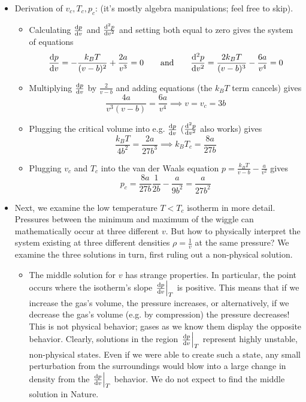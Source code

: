 \documentclass[11pt, a4paper]{article}
\begin{document}
\begin{itemize}
\begin{itemize}
	\end{itemize}
	
	\item Derivation of $ v_{c}, T_{c}, p_{c} $: (it's mostly algebra manipulations; feel free to skip). 
	\begin{itemize}
		\item Calculating $  \dv{p}{v} $ and $ \dv[2]{p}{v} $ and setting both equal to zero gives the system of equations
		\begin{equation*}
			\dv{p}{v} = -\frac{k_{B}T}{(v-b)^{2}} + \frac{2a}{v^{3}} = 0 \qquad \text{and} \qquad  \dv[2]{p}{v} = \frac{2k_{B}T}{(v-b)^{3}} - \frac{6a}{v^{4}} = 0
		\end{equation*}
		\item Multiplying $ \dv{p}{v} $ by $ \frac{2}{v-b} $ and adding  equations (the $ k_{B}T $ term cancels) gives 
		\begin{equation*}
			\frac{4a}{v^{3}(v-b)} = \frac{6a}{v^{4}} \implies v = v_{c} = 3b
		\end{equation*}
		
		\item Plugging the critical volume into e.g. $  \dv{p}{v} $ ($ \dv[2]{p}{v} $ also works) gives
		\begin{equation*}
			\frac{k_{B}T}{4b^{2}} = \frac{2a}{27b^{3}} \implies k_{B}T_{c} = \frac{8a}{27b}
		\end{equation*}
		
		\item Plugging $ v_{c} $ and $ T_{c} $ into the van der Waals equation $ p = \frac{k_{B}T}{v-b} - \frac{a}{v^{2}}$ gives
		\begin{equation*}
			p_{c} = \frac{8a}{27b}\frac{1}{2b} - \frac{a}{9b^{2}} = \frac{a}{27b^{2}}
		\end{equation*}
	
	\end{itemize}

	\item Next, we examine the low temperature $ T < T_{c} $ isotherm in more detail. Pressures between the minimum and maximum of the wiggle can mathematically occur at three different $ v $. But how to physically interpret the system existing at three different densities $ \rho = \frac{1}{v} $ at the same pressure? We examine the three solutions in turn, first ruling out a non-physical solution.
	\begin{itemize}
		\item The middle solution for $ v $ has strange properties. In particular, the point occurs where the isotherm's slope $ \eval{\dv{p}{v}}_{T} $ is positive. This means that if we increase the gas's volume, the pressure increases, or alternatively, if we decrease the gas's volume (e.g. by compression) the pressure decreases! This is not physical behavior; gases as we know them display the opposite behavior. Clearly, solutions in the region $ \eval{\dv{p}{v}}_{T} $ represent highly unstable, non-physical states. Even if we were able to create such a state, any small perturbation from the surroundings would blow into a large change in density from the $ \eval{\dv{p}{v}}_{T}  $ behavior. We do not expect to find the middle solution in Nature.
		

\end{itemize}
\end{itemize}
\end{document}
